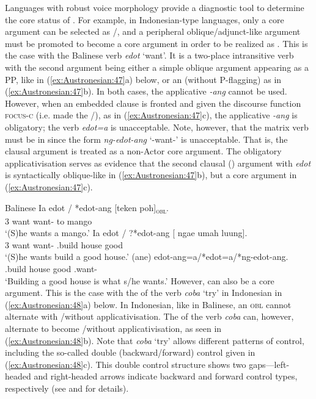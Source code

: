 \documentclass[output=paper,chinesefont]{../langscibook}
\begin{document}
Languages with robust voice morphology provide a diagnostic tool to determine the core status of \OPTXCOMP. For example, in Indonesian-type languages, only a core argument can be selected as \SUBJ/\PIVOT, and a peripheral oblique/adjunct-like argument must be promoted to become a core argument in order to be realized as \SUBJ. This is the case with the Balinese verb \emph{edot} `want'. It is a two-place intransitive verb with the second argument being either a simple oblique argument appearing as a PP, like in (\ref{ex:Austronesian:47}a) below, or an \XCOMP (without P-flagging) as in (\ref{ex:Austronesian:47}b). In both cases, the applicative \emph{-ang} cannot be used. However, when an embedded clause is fronted and given the discourse function \textsc{focus-c} (i.e. made the \PIVOT/\SUBJ), as in (\ref{ex:Austronesian:47}c), the applicative \emph{-ang} is obligatory; the verb \emph{edot=a} is unacceptable. Note, however, that the matrix verb must be in \UV since the \AV form \emph{ng-edot-ang} `\AV-want-\APPL' is unacceptable. That is, the clausal argument is treated as a non-Actor core argument. The obligatory applicativisation serves as evidence that the second clausal (\COMP) argument with \emph{edot} is syntactically oblique-like in (\ref{ex:Austronesian:47}b), but a core argument in (\ref{ex:Austronesian:47}c).

\ea\label{ex:Austronesian:47} Balinese  \citep[135]{Arka2003b}
\ea\gll
Ia edot / *edot-ang [teken poh]\textsubscript{\textsc{obl}}.\\
3 want {} want-{\APPL} \phantom{[}to mango\\
\glt`(S)he wants a mango.'
\ex\gll
Ia edot / ?*edot-ang [{\GAP} ngae umah luung]\textsubscript{\XCOMP}.\\
3 want {} want-{\APPL} \phantom{[}{\SUBJ} \AV.build house good\\
\glt`(S)he wants build a good house.'
\ex{}\textsubscript{\PIVOT} (ane) edot-ang=a/*edot=a/*ng-edot-ang.\\
\phantom{[}{\SUBJ} \AV.build house good \phantom{(}{\FOC} \UV.want- \\
\glt`Building a good house is what s/he wants.'
\z\z
However, \XCOMP can also be a core argument. This is the case with the \XCOMP of the verb \emph{coba} `try' in Indonesian in (\ref{ex:Austronesian:48}a) below. In Indonesian, like in Balinese, an \textsc{obl} cannot alternate with \SUBJ/\PIVOT without applicativisation. The \XCOMP of the verb \emph{coba} can, however, alternate to become \SUBJ/\PIVOT without applicativisation, as seen in (\ref{ex:Austronesian:48}b). Note that \emph{coba} `try' allows different patterns of control, including the so-called double (backward/forward) control given in (\ref{ex:Austronesian:48}c). This double control structure shows two gaps—left-headed and right-headed arrows indicate backward and forward control types, respectively (see \citealt{Arka2000} and \citealt{Arka2014} for details).
\end{document}
